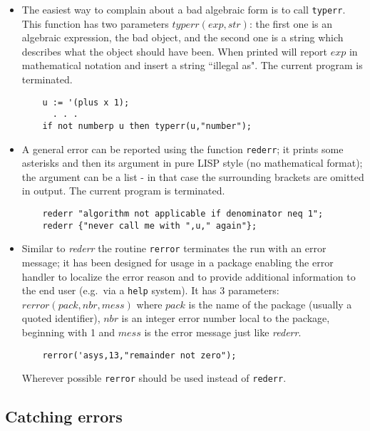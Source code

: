 \begin{itemize}
\item The easiest way to complain about a bad algebraic form is
  to call {\tt typerr}. This function has two parameters
  $typerr(exp,str)$: the first one is an algebraic expression,
  the bad object, and the second one is a string which describes
  what the object should have been. When printed {\reduce}
  will report $exp$ in mathematical notation and insert a string
  ``illegal as". The current program is terminated. 
\begin{verbatim}
    u := '(plus x 1);
      . . .
    if not numberp u then typerr(u,"number");
\end{verbatim}
\item A general error can be reported using the function 
  {\tt rederr}; it prints some asterisks 
  and then its argument in pure LISP style (no mathematical format);
  the argument can be a list - in that case the surrounding
  brackets are omitted in output. The current program is terminated.
\begin{verbatim}
    rederr "algorithm not applicable if denominator neq 1";
    rederr {"never call me with ",u," again"};
\end{verbatim}
\item Similar to {\em rederr} the routine {\tt rerror}
 terminates the run with an error message; it has
 been designed for usage in a {\reduce} package enabling
 the error handler to localize the error reason and to
 provide additional information to the end user (e.g.\ 
 via a {\tt help} system). It has 3 parameters:
 $rerror(pack,nbr,mess)$ where $pack$ is the name of
 the package (usually a quoted identifier), $nbr$ is
 an integer error number local to the package, beginning
 with 1 and $mess$  is the error message just like {\em rederr}.
\begin{verbatim}
    rerror('asys,13,"remainder not zero");
\end{verbatim}
 Wherever possible {\tt rerror} should be used instead of
 {\tt rederr}.
\end{itemize}

\subsection{Catching errors}

